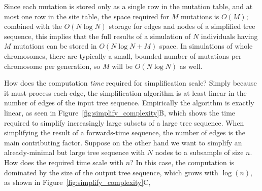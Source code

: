 \documentclass{article}
\begin{document}
Since each mutation is stored only as a single row in the mutation table,
and at most one row in the site table, the space required for $M$ mutations is $O(M)$;
combined with the $O(N \log N)$ storage for edges and nodes of a simplified tree sequence,
this implies that the full results of a simulation of $N$ individuals
having $M$ mutations can be stored in $O(N \log N + M)$ space.
In simulations of whole chromosomes, there are typically a small, bounded number of mutations per chromosome per generation,
so $M$ will be $O(N \log N)$ as well.

How does the computation \emph{time} required for simplification scale?
Simply because it must process each edge,
the simplification algorithm is at least linear in the number of edges of the input tree sequence.
Empirically the algorithm is exactly linear,
as seen in Figure~\ref{fig:simplify_complexity}B,
which shows the time required to simplify increasingly large subsets of a large tree sequence.
When simplifying the result of a forwards-time sequence, the number of edges is the main contributing factor.
Suppose on the other hand we want to
simplify an already-minimal but large tree sequence with $N$ nodes
to a subsample of size $n$.
How does the required time scale with $n$?
In this case, the computation is dominated by the size of the output tree sequence,
which grows with $\log(n)$, as shown in Figure~\ref{fig:simplify_complexity}C,


\end{document}

